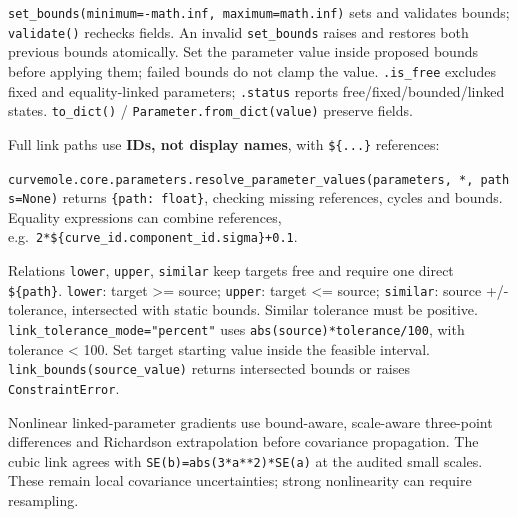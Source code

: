 \documentclass[
  10pt,
  a4paper,
  oneside]{scrreprt}
\newenvironment{Shaded}{}{}
\newcommand{\BuiltInTok}[1]{#1}
\newcommand{\NormalTok}[1]{#1}
\newcommand{\OperatorTok}[1]{\textcolor[rgb]{0.40,0.40,0.40}{#1}}
\newcommand{\StringTok}[1]{\textcolor[rgb]{0.25,0.44,0.63}{#1}}
\begin{document}
\texttt{set\_bounds(minimum=-math.inf,\ maximum=math.inf)} sets and
validates bounds; \texttt{validate()} rechecks fields. An invalid
\texttt{set\_bounds} raises and restores both previous bounds
atomically. Set the parameter value inside proposed bounds before
applying them; failed bounds do not clamp the value. \texttt{.is\_free}
excludes fixed and equality-linked parameters; \texttt{.status} reports
free/fixed/bounded/linked states. \texttt{to\_dict()} /
\texttt{Parameter.from\_dict(value)} preserve fields.

Full link paths use \textbf{IDs, not display names}, with
\texttt{\$\{...\}} references:

\begin{Shaded}
\end{Shaded}

\texttt{curvemole.core.parameters.resolve\_parameter\_values(parameters,\ *,\ paths=None)}
returns \texttt{\{path:\ float\}}, checking missing references, cycles
and bounds. Equality expressions can combine references,
e.g.~\texttt{2*\$\{curve\_id.component\_id.sigma\}+0.1}.

Relations \texttt{lower}, \texttt{upper}, \texttt{similar} keep targets
free and require one direct \texttt{\$\{path\}}. \texttt{lower}: target
\textgreater= source; \texttt{upper}: target \textless= source;
\texttt{similar}: source +/- tolerance, intersected with static bounds.
Similar tolerance must be positive.
\texttt{link\_tolerance\_mode="percent"} uses
\texttt{abs(source)*tolerance/100}, with tolerance \textless{} 100. Set
target starting value inside the feasible interval.
\texttt{link\_bounds(source\_value)} returns intersected bounds or
raises \texttt{ConstraintError}.

Nonlinear linked-parameter gradients use bound-aware, scale-aware
three-point differences and Richardson extrapolation before covariance
propagation. The cubic link agrees with \texttt{SE(b)=abs(3*a**2)*SE(a)}
at the audited small scales. These remain local covariance
uncertainties; strong nonlinearity can require resampling.
\end{document}
